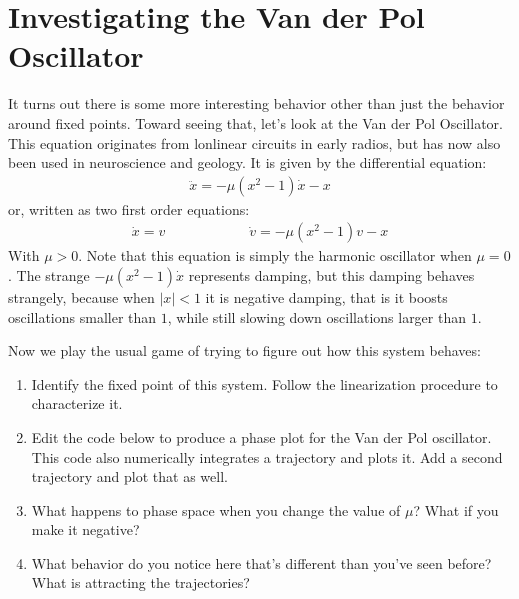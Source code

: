 \documentclass[letterpaper,10pt,english]{jupyterBook}
\begin{document}
\section{Investigating the Van der Pol Oscillator}
\label{\detokenize{content/1_mechanics/dynamical_2:investigating-the-van-der-pol-oscillator}}
\sphinxAtStartPar
It turns out there is some more interesting behavior other than just the behavior around fixed points. Toward seeing that, let’s look at the Van der Pol Oscillator. This equation originates from lonlinear circuits in early radios, but has now also been used in neuroscience and geology. It is given by the differential equation:
\begin{equation*}
\begin{split}
\ddot{x} = -\mu (x^2 - 1)\dot{x} - x
\end{split}
\end{equation*}
\sphinxAtStartPar
or, written as two first order equations:
\begin{equation*}
\begin{split}
\dot{x} = v \hspace{1in} \dot{v} = -\mu (x^2 - 1)v - x
\end{split}
\end{equation*}
\sphinxAtStartPar
With \(\mu > 0\). Note that this equation is simply the harmonic oscillator when \(\mu = 0\). The strange \(-\mu (x^2 - 1)\dot{x}\) represents damping, but this damping behaves strangely, because when \(|x|<1\) it is negative damping, that is it boosts oscillations smaller than \(1\), while still slowing down oscillations larger than \(1\).

\sphinxAtStartPar
Now we play the usual game of trying to figure out how this system behaves:

\sphinxAtStartPar
{}
\begin{enumerate}
%
\item {} 
\sphinxAtStartPar
Identify the fixed point of this system. Follow the linearization procedure to characterize it.

\item {} 
\sphinxAtStartPar
Edit the code below to produce a phase plot for the Van der Pol oscillator. This code also numerically integrates a trajectory and plots it. Add a second trajectory and plot that as well.

\item {} 
\sphinxAtStartPar
What happens to phase space when you change the value of \(\mu\)? What if you make it negative?

\item {} 
\sphinxAtStartPar
What behavior do you notice here that’s different than you’ve seen before? What is attracting the trajectories?

\end{enumerate}
\end{document}
